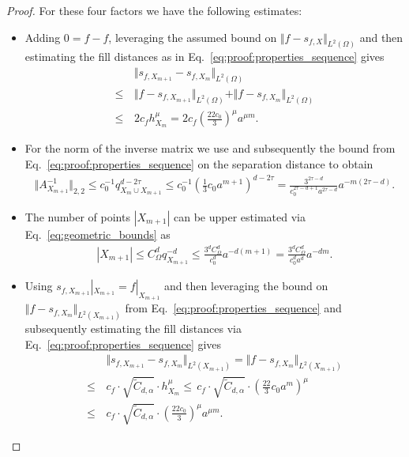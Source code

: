 \documentclass[a4paper, 10pt]{article}
\begin{document}
\begin{proof}
For these four factors we have the following estimates:
%
\begin{itemize}
\item Adding $0 = f - f$, leveraging the assumed bound on $\Vert f - s_{f, X} \Vert_{L^2(\Omega)}$ and then estimating the fill distances as in Eq.\ \eqref{eq:proof:properties_sequence} gives
\begin{align*}
&\Vert s_{f, X_{m+1}} - s_{f, X_{m}} \Vert_{L^2(\Omega)} \\
\leq \, &\Vert f - s_{f, X_{m+1}} \Vert_{L^2(\Omega)} + \Vert f - s_{f, X_{m}} \Vert_{L^2(\Omega)} \\
\leq \, &2c_f h_{X_m}^{\mu} = 2c_f \left( \frac{22c_0}{3} \right)^\mu a^{\mu m}.
\end{align*}
\item For the norm of the inverse matrix we use  and subsequently the bound from Eq.\ \eqref{eq:proof:properties_sequence} on the separation distance to obtain
\begin{align*}
\Vert A_{X_{m+1}}^{-1} \Vert_{2,2} \leq c_0^{-1} q_{X_m \cup X_{m+1}}^{d-2\tau} \leq c_0^{-1} \left(\frac{1}{3} c_0 a^{m+1} \right)^{d-2\tau} 
= \frac{3^{2\tau-d}}{c_0^{2\tau - d + 1} a^{2\tau-d}} a^{-m (2\tau - d)}.
%
\end{align*}
\item The number of points $|X_{m+1}|$ can be upper estimated via Eq.\ \eqref{eq:geometric_bounds} as 
\begin{align*}
|X_{m+1}| \leq C_\Omega^d q_{X_{m+1}}^{-d} \leq \frac{3^d C_\Omega^d}{c_0^d} a^{-d(m+1)} = \frac{3^d C_\Omega^d}{c_0^d a^d} a^{-dm}.
\end{align*}
\item Using $s_{f, X_{m+1}}|_{X_{m+1}} = f|_{X_{m+1}}$ and then leveraging the bound on $\Vert f - s_{f, X_m} \Vert_{L^2(X_{m+1})}$ from Eq.\ \eqref{eq:proof:properties_sequence} and subsequently estimating the fill distances via Eq.\ \eqref{eq:proof:properties_sequence} gives
\begin{align*}
&\Vert s_{f, X_{m+1}} - s_{f, X_{m}} \Vert_{L^2(X_{m+1})} = \Vert f - s_{f, X_{m}} \Vert_{L^2(X_{m+1})} \\
%
\leq \, &c_f \cdot \sqrt{\tilde{C}_{d, \alpha}} \cdot h_{X_m}^\mu \leq \, c_f \cdot \sqrt{\tilde{C}_{d, \alpha}} \cdot \left( \frac{22}{3} c_0 a^m \right)^\mu \\
\leq \, &c_f \cdot \sqrt{\tilde{C}_{d, \alpha}} \cdot \left( \frac{22c_0}{3} \right)^\mu a^{\mu m}.
\end{align*}
\end{itemize}


\end{proof}
\end{document}
